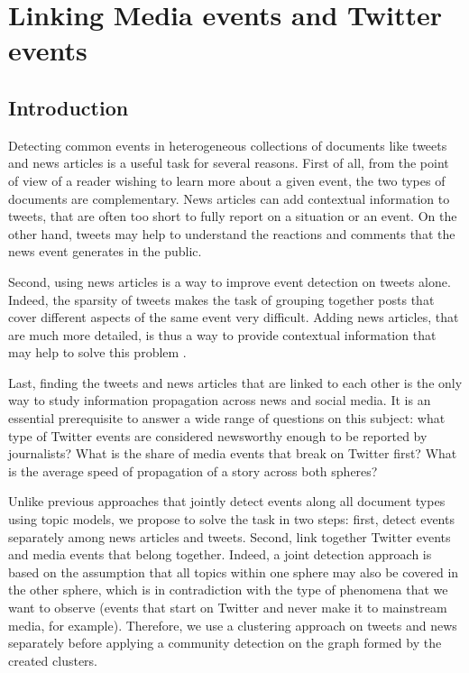 \chapter{Linking Media events and Twitter events}
\section{Introduction}

Detecting common events in heterogeneous collections of documents like tweets and news articles is a useful task for several reasons. First of all, from the point of view of a reader wishing to learn more about a given event, the two types of documents are complementary. News articles can add contextual information to tweets, that are often too short to fully report on a situation or an event. On the other hand, tweets may help to understand the reactions and comments that the news event generates in the public. 

Second, using news articles is a way to improve event detection on tweets alone. Indeed, the sparsity of tweets makes the task of grouping together posts that cover different aspects 
of the same event very difficult. Adding news articles, that are much more detailed, is thus a way to provide contextual information that may help to solve this problem \citep{phan_2008_learning}.

Last, finding the tweets and news articles that are linked to each other is the only way to study information propagation across news and social media. It is an essential prerequisite to answer a wide range of questions on this subject: what type of Twitter events are considered newsworthy enough to be reported by journalists? What is the share of media events that break on Twitter first? What is the average speed of propagation of a story across both spheres?

Unlike previous approaches that jointly detect events along all document types using topic models, we propose to solve the task in two steps: first, detect events separately among news articles and tweets. Second, link together Twitter events and media events that belong together. Indeed, a joint detection approach is based on the assumption that all topics within one sphere may also be covered in the other sphere, which is in contradiction with the type of phenomena that we want to observe (events that start on Twitter and never make it to mainstream media, for example). Therefore, we use a clustering approach on tweets and news separately before applying a community detection on the graph formed by the created clusters.

